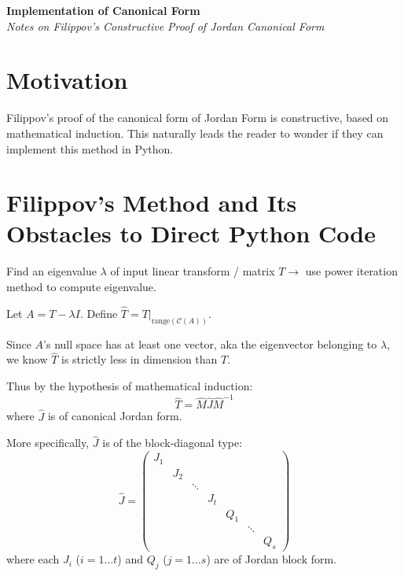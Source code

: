 \documentclass[12pt, a4paper]{article}
\begin{document}
\begin{center}
    {\LARGE \textbf{\color{primary} Implementation of Canonical Form}} \\[0.5em]
    {\large \textit{Notes on Filippov's Constructive Proof of Jordan Canonical Form}}
\end{center}

\vspace{1em}

\section*{\color{primary} Motivation}
Filippov's proof of the canonical form of Jordan Form is constructive, based on mathematical induction. This naturally leads the reader to wonder if they can implement this method in Python.

\section*{\color{primary} Filippov's Method and Its Obstacles to Direct Python Code}

\begin{description}[font=\normalfont\bfseries\color{accent}, leftmargin=1.5em]
    \item[Step 1.] Find an eigenvalue $\lambda$ of input linear transform / matrix $T \longrightarrow$ use power iteration method to compute eigenvalue.
    \item[Step 2.] Let $A = T - \lambda I$. Define $\hat{T} = T\vert_{\text{range}(\mathcal{C}(A))}$.
    \item[Step 3.] Since $A$'s null space has at least one vector, aka the eigenvector belonging to $\lambda$, we know $\hat{T}$ is strictly less in dimension than $T$.
\end{description}

Thus by the hypothesis of mathematical induction:
\[
\hat{T} = \hat{M} \hat{J} \hat{M}^{-1}
\]
where $\hat{J}$ is of canonical Jordan form.

\vspace{0.5em}
More specifically, $\hat{J}$ is of the block-diagonal type:
\[
\hat{J} = \begin{pmatrix}
J_1 & & & & & \\
& J_2 & & & & \\
& & \ddots & & & \\
& & & J_t & & \\
& & & & Q_1 & \\
& & & & & \ddots & \\
& & & & & & Q_s
\end{pmatrix}
\]
where each $J_i$ ($i = 1 \dots t$) and $Q_j$ ($j = 1 \dots s$) are of Jordan block form. 
\end{document}
